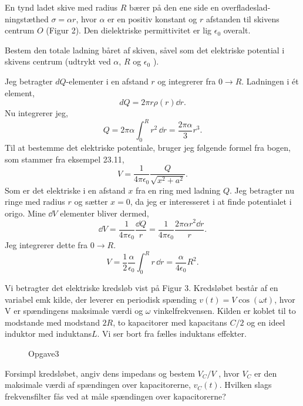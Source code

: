 \begin{exercise}[Opgave 2]
En tynd ladet skive med radius $R$ bærer på den ene side en overfladeslad-
ningstæthed $\sigma = \alpha r$, hvor $\alpha $ er en positiv konstant og $r$ afstanden til skivens
centrum $O$ (Figur 2). Den dielektriske permittivitet er lig $\epsilon_0$ overalt.
\end{exercise}
\begin{figure}[ht]
    \centering
    \label{fig:opgave2}
\end{figure}
\begin{subexercise}[a]
	Bestem den totale ladning båret af skiven, såvel som det elektriske potential i skivens centrum (udtrykt ved $\alpha $, $R$ og $\epsilon_0$ ).
\end{subexercise}
\begin{solution}
Jeg betragter $dQ$-elementer i en afstand $r$ og integrerer fra $0 \to R$. Ladningen i ét element,
\[
dQ = 2\pi r \rho\left( r \right) \dd r
.\]
Nu integrerer jeg,
\[
Q = 2\pi \alpha \int_{0}^{R} r^2 \, \dd r= \frac{2\pi \alpha }{3} r^3
.\] 
Til at bestemme det elektriske potentiale, bruger jeg følgende formel fra bogen, som stammer fra eksempel 23.11,
\[
V = \frac{1}{4\pi\epsilon_0}\frac{Q}{\sqrt{x^2+a^2} }
.\]
Som er det elektriske i en afstand $x$ fra en ring med ladning $Q$. Jeg betragter nu ringe med radius $r$ og sætter $x=0$, da jeg er interesseret i at finde potentialet i origo. Mine $\dd V$ elementer bliver dermed,
\[
\dd V = \frac{1}{4\pi\epsilon_0} \frac{\dd Q}{r} = \frac{1}{4\pi\epsilon_0} \frac{2\pi \alpha r^2 \dd r}{r}
.\] 
Jeg integrerer dette fra $0\to R$.
\[
V = \frac{1}{2} \frac{\alpha }{\epsilon_0}\int_{0}^{R} r\, \dd r = \frac{\alpha }{4\epsilon_0}R^2
.\] 
\end{solution}
\begin{exercise}[Opgave 3]
Vi betragter det elektriske kredsløb vist på Figur 3. Kredsløbet består af en
variabel emk kilde, der leverer en periodisk spænding $v(t) = V \cos(\omega t)$, hvor
V er spændingens maksimale værdi og $\omega$ vinkelfrekvensen. Kilden er koblet
til to modstande med modstand $2R$, to kapacitorer med kapacitans $C /2$ og
en ideel induktor med induktans$ L$. Vi ser bort fra fælles induktans effekter.
\end{exercise}
\begin{figure}[ht]
    \centering
    \caption{Opgave3}
    \label{fig:opgave3}
\end{figure}
\begin{subexercise}[a]
Forsimpl kredsløbet, angiv dens impedans og bestem $V_C /V$ , hvor $V_C$ er
den maksimale værdi af spændingen over kapacitorerne, $v_C (t)$. Hvilken
slags frekvensfilter fås ved at måle spændingen over kapacitorerne?
\end{subexercise}
